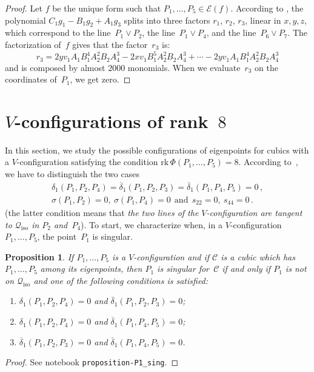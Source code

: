 \documentclass[a4paper, 11pt, reqno]{amsart}
\theoremstyle{plain}
\newtheorem{prop}[lemma]{Proposition}
\theoremstyle{definition}
\newcommand{\rk}{\ensuremath{\mathrm{rk}}}
\newcommand{\iso}{\mathcal{Q}_{\mathrm{iso}}}
\newcommand{\Eig}[1]{\mathcal{E}\!\left( {#1} \right)}
\begin{document}
\begin{proof}
Let $f$ be the unique form such that $P_1, \dotsc, P_5 \in \Eig{f}$.
According to , the polynomial
$C_1g_1-B_1g_2+A_1g_3$ splits into three factors $r_1$, $r_2$, $r_3$,
linear in $x, y, z$, which
correspond to the line~$P_1 \vee P_2$, the line~$P_1 \vee P_4$, and the line~$P_6 \vee P_7$.
The factorization of~$f$ gives that the factor~$r_3$ is:
%
\[
  r_3 = 2yv_1A_1B_1^4A_2^2B_2A_4^3-2xv_1B_1^5A_2^2B_2A_4^3+\cdots
  -2 yv_1A_1B_1^4A_2^2B_2A_4^3
\]
%
and is composed by almost $2000$ monomials. When we
evaluate~$r_3$ on the coordinates of~$P_1$, we get zero.
\end{proof}


\section{\texorpdfstring{$V$}{V}-configurations of rank~\texorpdfstring{$8$}{8}}
\label{rank_8}
%
In this section, we study the possible configurations of
eigenpoints for cubics with a $V$-configuration
satisfying the condition $\rk \, \Phi(P_1, \dots, P_5) = 8$. According
to~, we have to distinguish the two cases
%
\begin{gather}
  \delta_1(P_1, P_2, P_4)=\overline{\delta}_1(P_1, P_2, P_3) =
  \overline{\delta}_1(P_1, P_4, P_5) = 0 \,,
  \label{rk8_1} \\
  \sigma(P_1, P_2) = 0, \ \sigma(P_1, P_4) = 0 \ \ \mbox{and} \ \ s_{22} = 0,
  \ s_{44} = 0 \,.
  \label{rk8_2}
\end{gather}
%
(the latter condition means that \emph{the two lines of
the $V$-configuration are tangent to $\iso$ in $P_2$ and~$P_4$}).
%
To start, we characterize when, in a $V$-configuration
$P_1, \dotsc, P_5$, the point~$P_1$ is singular.

\begin{prop}
\label{proposition:P1_sing}
If $P_1, \dots, P_5$ is a $V$-configuration and if
$\mathcal{C}$ is a cubic which
has $P_1, \dots, P_5$ among its eigenpoints, then $P_1$ is
singular for~$\mathcal{C}$ if
and only if $P_1$ is not on $\iso$ and one of the following conditions
is satisfied:
%
\begin{enumerate}
  \item $\delta_1(P_1, P_2, P_4) = 0$ and $\overline{\delta}_1(P_1, P_2, P_3) = 0$;
  \item $\delta_1(P_1, P_2, P_4) = 0$ and $\overline{\delta}_1(P_1, P_4, P_5) = 0$;
  \item $\overline{\delta}_1(P_1, P_2, P_3) = 0$ and
  $\overline{\delta}_1(P_1, P_4, P_5) = 0$.
\end{enumerate}
%
\end{prop}
\begin{proof}
See notebook \texttt{proposition-P1\_sing}.
\end{proof}
\end{document}
